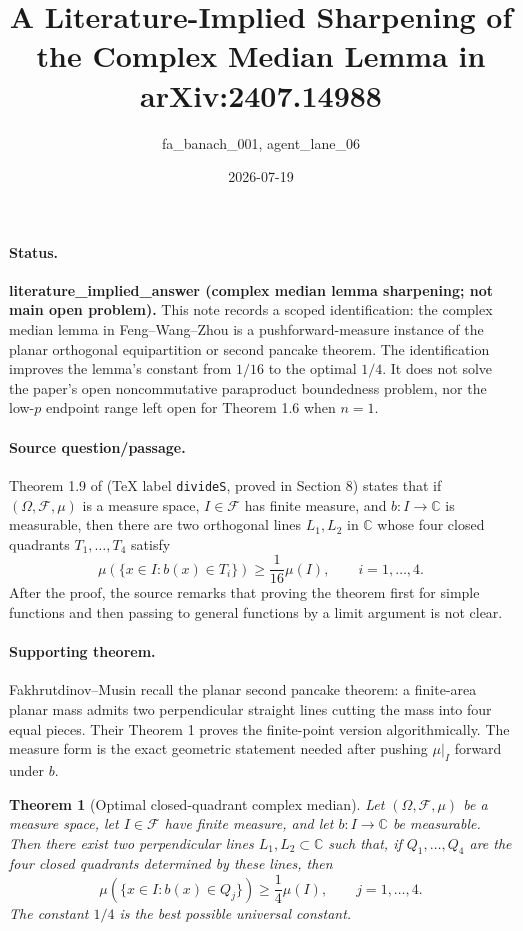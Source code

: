 \documentclass[11pt]{article}
\title{A Literature-Implied Sharpening of the Complex Median Lemma in arXiv:2407.14988}
\author{fa\_banach\_001, agent\_lane\_06}
\date{2026-07-19}
\newtheorem{theorem}{Theorem}
\begin{document}
\maketitle

\paragraph{Status.}
\textbf{literature\_implied\_answer (complex median lemma sharpening; not main open problem).}
This note records a scoped identification: the complex median lemma in Feng--Wang--Zhou
\cite{FWZ2407} is a pushforward-measure instance of the planar orthogonal equipartition
or second pancake theorem. The identification improves the lemma's constant from
$1/16$ to the optimal $1/4$. It does not solve the paper's open noncommutative
paraproduct boundedness problem, nor the low-$p$ endpoint range left open for
Theorem 1.6 when $n=1$.

\paragraph{Source question/passage.}
Theorem 1.9 of \cite{FWZ2407} (TeX label \texttt{divideS}, proved in Section 8)
states that if $(\Omega,\mathcal F,\mu)$ is a measure space, $I\in\mathcal F$ has
finite measure, and $b:I\to\mathbb C$ is measurable, then there are two orthogonal
lines $L_1,L_2$ in $\mathbb C$ whose four closed quadrants $T_1,\ldots,T_4$ satisfy
\[
  \mu(\{x\in I:b(x)\in T_i\})\ge \frac{1}{16}\mu(I),\qquad i=1,\ldots,4.
\]
After the proof, the source remarks that proving the theorem first for simple
functions and then passing to general functions by a limit argument is not clear.

\paragraph{Supporting theorem.}
Fakhrutdinov--Musin \cite{FM2511} recall the planar second pancake theorem:
a finite-area planar mass admits two perpendicular straight lines cutting the
mass into four equal pieces. Their Theorem 1 proves the finite-point version
algorithmically. The measure form is the exact geometric statement needed after
pushing $\mu|_I$ forward under $b$.

\begin{theorem}[Optimal closed-quadrant complex median]
Let $(\Omega,\mathcal F,\mu)$ be a measure space, let $I\in\mathcal F$ have finite
measure, and let $b:I\to\mathbb C$ be measurable. Then there exist two perpendicular
lines $L_1,L_2\subset\mathbb C$ such that, if $Q_1,\ldots,Q_4$ are the four closed
quadrants determined by these lines, then
\[
  \mu(\{x\in I:b(x)\in Q_j\})\ge \frac{1}{4}\mu(I),
  \qquad j=1,\ldots,4.
\]
The constant $1/4$ is the best possible universal constant.
\end{theorem}
\end{document}
